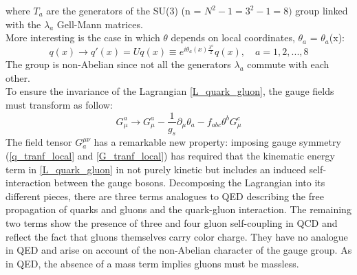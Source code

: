 where $T_{a}$ are the generators of the SU(3) (n = $N^{2} - 1 = 3^{2} - 1 = 8)$ group linked with the $\lambda_{a}$ Gell-Mann matrices. \\
More interesting is the case in which $\theta$ depends on local coordinates, $\theta_{a}$ = $\theta_{a}$(x):
\begin{equation}
q(x) \to q'(x) = Uq(x) \equiv e^{i\theta_{a}(x)\frac{\lambda^{a}}{2}}q(x), \quad a = 1, 2, ...,8
\label{q_tranf_local}
\end{equation}
The group is non-Abelian since not all the generators $\lambda_{a}$ commute with each other. \\
To ensure the invariance of the Lagrangian \ref{L_quark_gluon}, the gauge fields must transform as follow:
\begin{equation}
G^{a}_{\mu} \to G^{a}_{\mu} - \frac{1}{g_{s}} \partial_{\mu}\theta_{a} - f_{abc}\theta^{b}G^{c}_{\mu}
\label{G_tranf_local}
\end{equation}
The field tensor $G^{\mu\nu}_{a}$ has a remarkable new property: imposing gauge symmetry (\ref{q_tranf_local} and \ref{G_tranf_local}) has required that the kinematic energy term in \ref{L_quark_gluon} in not purely kinetic but includes an induced self-interaction between the gauge bosons. Decomposing the Lagrangian into its different pieces, there are three terms analogues to QED describing the free propagation of quarks and gluons and the quark-gluon interaction. The remaining two terms show the presence of three and four gluon self-coupling in QCD and reflect the fact that gluons themselves carry color charge. They have no analogue in QED and arise on account of the non-Abelian character of the gauge group. As in QED, the absence of a mass term implies gluons must be massless.\\


